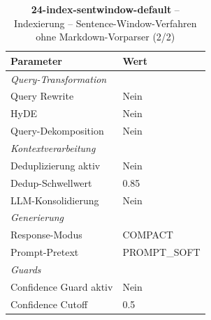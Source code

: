 \begin{table}[H]
\centering
\small
\setlength{\tabcolsep}{4pt}
\begin{tabular}{lp{8cm}}
\toprule
\textbf{Parameter} & \textbf{Wert} \\
\midrule
\multicolumn{2}{l}{\textit{Query-Transformation}} \\
\midrule
\quad Query Rewrite & Nein \\
\quad HyDE & Nein \\
\quad Query-Dekomposition & Nein \\
\midrule
\multicolumn{2}{l}{\textit{Kontextverarbeitung}} \\
\midrule
\quad Deduplizierung aktiv & Nein \\
\quad Dedup-Schwellwert & 0.85 \\
\quad LLM-Konsolidierung & Nein \\
\midrule
\multicolumn{2}{l}{\textit{Generierung}} \\
\midrule
\quad Response-Modus & COMPACT \\
\quad Prompt-Pretext & PROMPT\_SOFT \\
\midrule
\multicolumn{2}{l}{\textit{Guards}} \\
\midrule
\quad Confidence Guard aktiv & Nein \\
\quad Confidence Cutoff & 0.5 \\
\bottomrule
\end{tabular}
\caption{\textbf{24-index-sentwindow-default} -- Indexierung -- Sentence-Window-Verfahren ohne Markdown-Vorparser (2/2)}
\label{tab:config_24_index_sentwindow_default_b}
\end{table}
